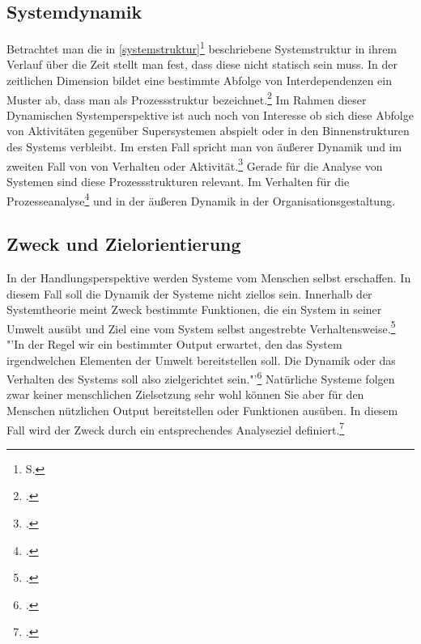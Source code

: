 \documentclass[a4paper,12pt]{article}
\begin{document}
\subsection{Systemdynamik}\label{systemdynamik}
Betrachtet man die in \ref{systemstruktur}\footnote{S. \pageref{systemstruktur}} beschriebene Systemstruktur in ihrem Verlauf über die Zeit stellt man fest, dass diese nicht statisch sein muss. In der zeitlichen Dimension bildet eine bestimmte Abfolge von Interdependenzen ein Muster ab, dass man als Prozessstruktur bezeichnet.\footcite[S. 110]{Ulrich1968} Im Rahmen dieser Dynamischen Systemperspektive ist auch noch von Interesse ob sich diese Abfolge von Aktivitäten gegenüber Supersystemen abspielt oder in den Binnenstrukturen des Systems verbleibt. Im ersten Fall spricht man von äußerer Dynamik und im zweiten Fall von von Verhalten oder Aktivität.\footcite[S. 113]{Ulrich1968} Gerade für die Analyse von Systemen sind diese Prozessstrukturen relevant. Im Verhalten für die Prozesseanalyse\footcite[S. 114]{Ulrich1968} und in der äußeren Dynamik in der Organisationsgestaltung.

\subsection{Zweck und Zielorientierung}\label{zweckundziel}
In der Handlungsperspektive werden Systeme vom Menschen selbst erschaffen. In diesem Fall soll die Dynamik der Systeme nicht ziellos sein. Innerhalb der Systemtheorie meint Zweck bestimmte Funktionen, die ein System in seiner Umwelt ausübt und Ziel eine vom System selbst angestrebte Verhaltensweise.\footcite[S. 114]{Ulrich1968} "'In der Regel wir ein bestimmter Output erwartet, den das System irgendwelchen Elementen der Umwelt bereitstellen soll. Die Dynamik oder das Verhalten des Systems soll also zielgerichtet sein."'\footcite[S. 114]{Ulrich1968} Natürliche Systeme folgen zwar keiner menschlichen Zielsetzung sehr wohl können Sie aber für den Menschen nützlichen Output bereitstellen oder Funktionen ausüben. In diesem Fall wird der Zweck durch ein entsprechendes Analyseziel definiert.\footcite[S. 114]{Ulrich1968}
\end{document}
